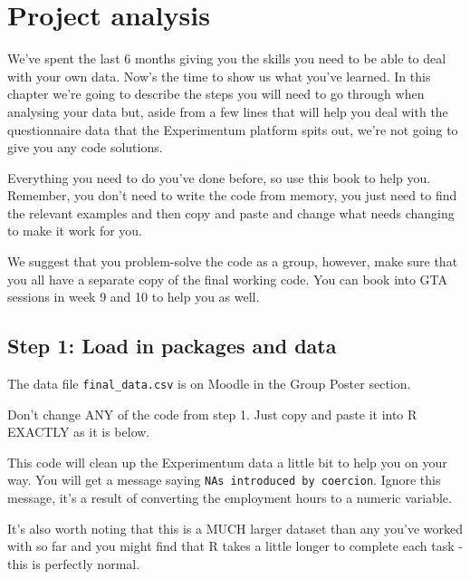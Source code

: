 \documentclass[
  oneside]{book}
\begin{document}
\hypertarget{project-analysis}{%
\chapter{Project analysis}\label{project-analysis}}

We've spent the last 6 months giving you the skills you need to be able to deal with your own data. Now's the time to show us what you've learned. In this chapter we're going to describe the steps you will need to go through when analysing your data but, aside from a few lines that will help you deal with the questionnaire data that the Experimentum platform spits out, we're not going to give you any code solutions.

Everything you need to do you've done before, so use this book to help you. Remember, you don't need to write the code from memory, you just need to find the relevant examples and then copy and paste and change what needs changing to make it work for you.

We suggest that you problem-solve the code as a group, however, make sure that you all have a separate copy of the final working code. You can book into GTA sessions in week 9 and 10 to help you as well.

\hypertarget{step-1-load-in-packages-and-data}{%
\section{Step 1: Load in packages and data}\label{step-1-load-in-packages-and-data}}

The data file \texttt{final\_data.csv} is on Moodle in the Group Poster section.

Don't change ANY of the code from step 1. Just copy and paste it into R EXACTLY as it is below.

This code will clean up the Experimentum data a little bit to help you on your way. You will get a message saying \texttt{NAs\ introduced\ by\ coercion}. Ignore this message, it's a result of converting the employment hours to a numeric variable.

It's also worth noting that this is a MUCH larger dataset than any you've worked with so far and you might find that R takes a little longer to complete each task - this is perfectly normal.
\end{document}
